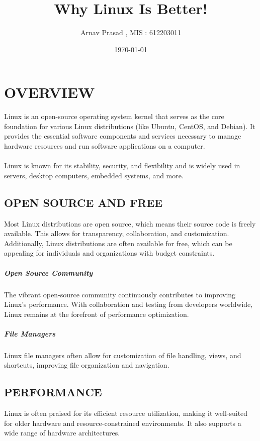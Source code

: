 \documentclass{article}
\begin{document}
\title{Why Linux Is Better!}
\author{Arnav Prasad , MIS : 612203011}
\date{\today}
\maketitle


\newpage

\section{OVERVIEW}

Linux is an open-source operating system kernel that serves as the core foundation for various Linux distributions (like Ubuntu, CentOS, and Debian). It provides the essential software components and services necessary to manage hardware resources and run software applications on a computer. 
\paragraph{}
Linux is known for its stability, security, and flexibility and is widely used in servers, desktop computers, embedded systems, and more.

\subsection{OPEN SOURCE AND FREE}
 Most Linux distributions are open source, which means their source code is freely available. This allows for transparency, collaboration, and customization. Additionally, Linux distributions are often available for free, which can be appealing for individuals and organizations with budget constraints.

\subparagraph{Open Source Community}
The vibrant open-source community continuously contributes to improving Linux's performance. With collaboration and testing from developers worldwide, Linux remains at the forefront of performance optimization.

\subparagraph{File Managers}
Linux file managers often allow for customization of file handling, views, and shortcuts, improving file organization and navigation.

\subsection{PERFORMANCE}
Linux is often praised for its efficient resource utilization, making it well-suited for older hardware and resource-constrained environments. It also supports a wide range of hardware architectures.
\end{document}
